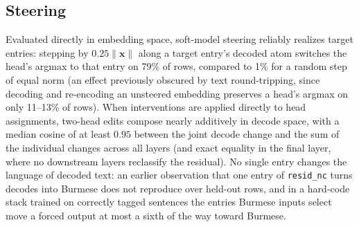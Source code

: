 \subsection{Steering}
\label{sec:prelim-steer}
Evaluated directly in embedding space, soft-model steering reliably
realizes target entries: stepping by $0.25\lVert\mathbf{x}\rVert$ along a
target entry's decoded atom switches the head's argmax to that entry on
79\% of rows, compared to 1\% for a random step of equal norm (an effect
previously obscured by text round-tripping, since decoding and
re-encoding an unsteered embedding preserves a head's argmax on only
11--13\% of rows). When interventions are applied directly to head
assignments, two-head edits compose nearly additively in decode space,
with a median cosine of at least $0.95$ between the joint decode change
and the sum of the individual changes across all layers (and exact
equality in the final layer, where no downstream layers reclassify the
residual). No single entry changes the language of decoded text: an
earlier observation that one entry of \texttt{resid\_nc} turns decodes
into Burmese does not reproduce over held-out rows, and in a hard-code
stack trained on correctly tagged sentences the entries Burmese inputs
select move a forced output at most a sixth of the way toward Burmese.

